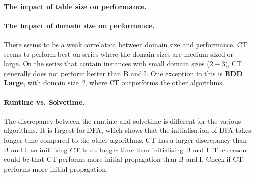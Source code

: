 \documentclass[a4paper,11pt]{article}
\newcommand{\Todo}[1]{{\color{blue}#1}}
\newcommand{\CTpaper}[0]{DBLP:conf/cp/DemeulenaereHLP16}
\numberwithin{equation}{section}
\begin{document}
\paragraph{The impact of table size on performance.}


\paragraph{The impact of domain size on performance.}
There seems to be a weak correlation between domain size and performance.
CT seems to perform best on series where the domain sizes are
medium sized or large. On the series that contain instances with
small domain sizes ($2-3$), CT generally does not perform
better than B and I. One exception to this is \textbf{BDD Large},
with domain size~$2$, where CT outperforms the other algorithms.

\paragraph{Runtime vs. Solvetime.}
The discrepancy between the runtime and solvetime is different for the various
algorithms. It is largest for DFA, which shows that the initialisation of DFA
takes longer time compared to the other algorithms.
CT has a larger discrepancy than B and I, so initilising CT takes longer time
than initialising B and I. The reason could be that CT performs more initial propagation
than B and I. \Todo{Check if CT performs more initial propagation}.






\end{document}
